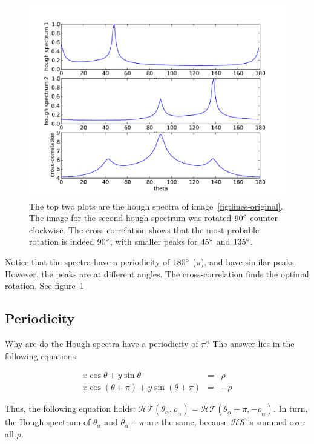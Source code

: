 \begin{figure}[ht]
	\centering
	\includegraphics[width=\textwidth]{images/stitching/lines-cross-correlation.pdf}
	\caption{The top two plots are the hough spectra of image~\ref{fig:lines-original}. The image for the second hough spectrum was rotated $90\degree$ counter-clockwise. The cross-correlation shows that the most probable rotation is indeed $90\degree$, with smaller peaks for $45\degree$ and $135\degree$.}
	\label{fig:lines-cross-correlation}
\end{figure}

Notice that the spectra have a periodicity of $180\degree$ ($\pi$), and have similar peaks. However, the peaks are at different angles. The cross-correlation finds the optimal rotation. See figure~\ref{fig:lines-cross-correlation}

\subsection{Periodicity}
\label{sub:periodicity}
Why are do the Hough spectra have a periodicity of $\pi$? The answer lies in the following equations:

\begin{eqnarray}
x\cos \theta + y\sin \theta &=& \rho \\
x\cos(\theta + \pi) + y\sin (\theta + \pi) &=& -\rho
\end{eqnarray}

Thus, the following equation holds: $\mathcal{HT}(\theta_\alpha, \rho_\alpha) = \mathcal{HT}(\theta_\alpha + \pi, -\rho_\alpha)$. In turn, the Hough spectrum of $\theta_\alpha$ and $\theta_\alpha + \pi$ are the same, because $\mathcal{HS}$ is summed over all $\rho$. 

